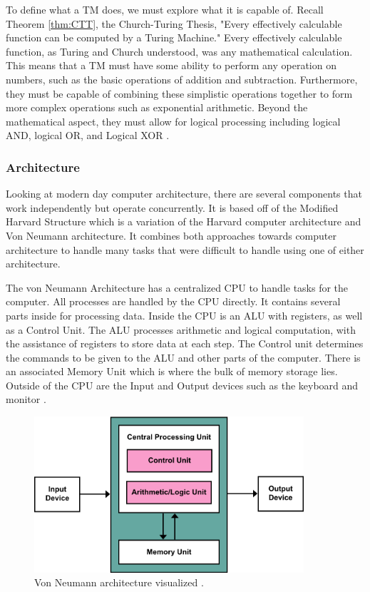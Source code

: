 To define what a TM does, we must explore what it is capable of.
Recall Theorem \ref{thm:CTT}, the Church-Turing Thesis, "Every effectively calculable function can be computed by a Turing Machine."
Every effectively calculable function, as Turing and Church understood, was any mathematical calculation.
This means that a TM must have some ability to perform any operation on numbers, such as the basic operations of addition and subtraction.
Furthermore, they must be capable of combining these simplistic operations together to form more complex operations such as exponential arithmetic.
Beyond the mathematical aspect, they must allow for logical processing including logical AND, logical OR, and Logical XOR \cite{ChemTM}.

\subsubsection{Architecture}\label{subsubsec:Arch}

Looking at modern day computer architecture, there are several components that work independently but operate concurrently.
It is based off of the Modified Harvard Structure which is a variation of the Harvard computer architecture and Von Neumann architecture.
It combines both approaches towards computer architecture to handle many tasks that were difficult to handle using one of either architecture.

The von Neumann Architecture has a centralized CPU to handle tasks for the computer.
All processes are handled by the CPU directly.
It contains several parts inside for processing data.
Inside the CPU is an ALU with registers, as well as a Control Unit.
The ALU processes arithmetic and logical computation, with the assistance of registers to store data at each step.
The Control unit determines the commands to be given to the ALU and other parts of the computer.
There is an associated Memory Unit which is where the bulk of memory storage lies.
Outside of the CPU are the Input and Output devices such as the keyboard and monitor \cite{vonNeumannBook}.

\begin{figure}[htb]
    \centering
    \includegraphics[width=10cm]{Images/Von_Neumann_Architecture.png}
       \caption{Von Neumann architecture visualized \cite{vonNeumannImg}.}
           \label{fig:VonNeumannArch}
\end{figure}

